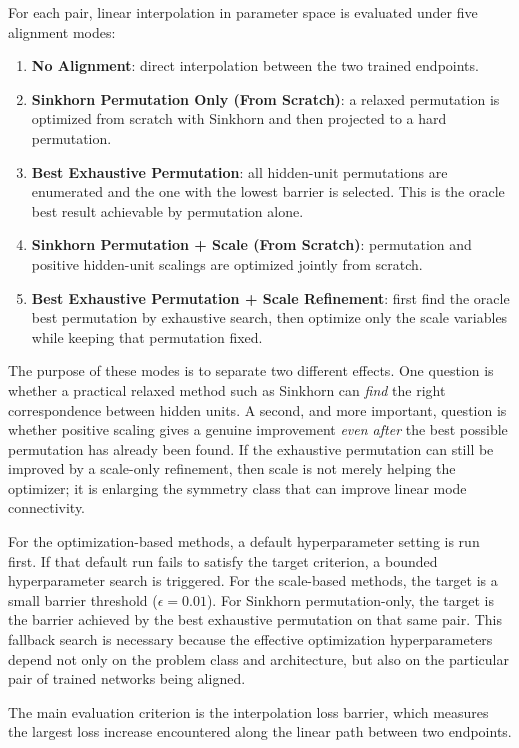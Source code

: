 \documentclass[11pt,a4paper]{article}
\begin{document}
For each pair, linear interpolation in parameter space is evaluated under five alignment modes:
\begin{enumerate}[leftmargin=1.5em]
    \item \textbf{No Alignment}: direct interpolation between the two trained endpoints.
    \item \textbf{Sinkhorn Permutation Only (From Scratch)}: a relaxed permutation is optimized from scratch with Sinkhorn and then projected to a hard permutation.
    \item \textbf{Best Exhaustive Permutation}: all hidden-unit permutations are enumerated and the one with the lowest barrier is selected. This is the oracle best result achievable by permutation alone.
    \item \textbf{Sinkhorn Permutation + Scale (From Scratch)}: permutation and positive hidden-unit scalings are optimized jointly from scratch.
    \item \textbf{Best Exhaustive Permutation + Scale Refinement}: first find the oracle best permutation by exhaustive search, then optimize only the scale variables while keeping that permutation fixed.
\end{enumerate}

The purpose of these modes is to separate two different effects. One question is whether a practical relaxed method such as Sinkhorn can \emph{find} the right correspondence between hidden units. A second, and more important, question is whether positive scaling gives a genuine improvement \emph{even after} the best possible permutation has already been found. If the exhaustive permutation can still be improved by a scale-only refinement, then scale is not merely helping the optimizer; it is enlarging the symmetry class that can improve linear mode connectivity.

For the optimization-based methods, a default hyperparameter setting is run first. If that default run fails to satisfy the target criterion, a bounded hyperparameter search is triggered. For the scale-based methods, the target is a small barrier threshold ($\epsilon=0.01$). For Sinkhorn permutation-only, the target is the barrier achieved by the best exhaustive permutation on that same pair. This fallback search is necessary because the effective optimization hyperparameters depend not only on the problem class and architecture, but also on the particular pair of trained networks being aligned.

The main evaluation criterion is the interpolation loss barrier, which measures the largest loss increase encountered along the linear path between two endpoints.
\end{document}
